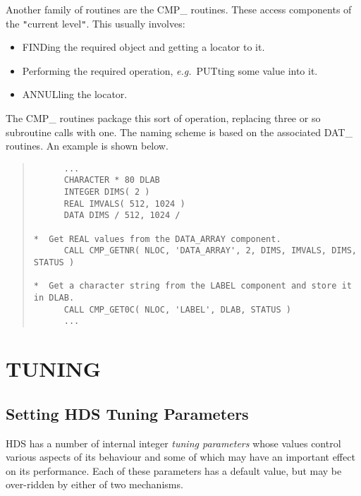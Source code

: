 \documentclass[11pt]{article}
\newcommand{\htmlref}[2]{#1}
\newcommand{\xlabel}[1]{}
\newcommand{\qt}[1]{``#1''}
\newcommand{\st}[1]{{\em{#1}}}
\renewcommand{\qt}[1]{{\tt{"}}#1{\tt{"}}}
\begin{document}
Another family of routines are the \htmlref{CMP\_
routines}{appendix:cmproutines}. These access components of the
\qt{current level}. This usually involves:

\begin{itemize}

\item FINDing the required object and getting a \htmlref{locator}{sect:locators} to it.

\item Performing the required operation, \st{e.g.}\ PUTting some
value into it.

\item \htmlref{ANNULling}{sect:annul} the locator.

\end{itemize}

The CMP\_ routines package this sort of operation, replacing three or so
subroutine calls with one. The naming scheme is based on the
associated \htmlref{DAT\_ routines}{appendix:datroutines}. An example is
shown below.

\small
\begin{quote}
\begin{verbatim}
      ...
      CHARACTER * 80 DLAB
      INTEGER DIMS( 2 )
      REAL IMVALS( 512, 1024 )
      DATA DIMS / 512, 1024 /

*  Get REAL values from the DATA_ARRAY component.
      CALL CMP_GETNR( NLOC, 'DATA_ARRAY', 2, DIMS, IMVALS, DIMS, STATUS )

*  Get a character string from the LABEL component and store it in DLAB.
      CALL CMP_GET0C( NLOC, 'LABEL', DLAB, STATUS )
      ...
\end{verbatim}
\end{quote}
\normalsize

\section{\xlabel{tuning_HDS}\label{sect:tuning}TUNING}

\subsection{\xlabel{setting_HDS_tuning_parameters}Setting HDS Tuning Parameters}

HDS has a number of internal integer \st{tuning parameters} whose
values control various aspects of its behaviour and some of which may
have an important effect on its performance. Each of these parameters
has a default value, but may be over-ridden by either of two
mechanisms.
\end{document}
